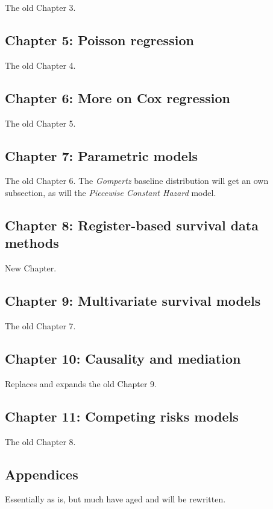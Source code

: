 \documentclass[a4paper,11pt]{article}
\begin{document}
The old Chapter 3.

\subsection*{Chapter 5: Poisson regression}

The old Chapter 4.

\subsection*{Chapter 6: More on Cox regression}

The old Chapter 5.

\subsection*{Chapter 7: Parametric models}

The old Chapter 6. The \emph{Gompertz} baseline distribution will get an
own subsection, as will the \emph{Piecewise Constant Hazard} model.

\subsection*{Chapter 8: Register-based survival data methods}

New Chapter.

\subsection*{Chapter 9: Multivariate survival models}

The old Chapter 7.

\subsection*{Chapter 10: Causality and mediation}

Replaces and expands the old Chapter 9.

\subsection*{Chapter 11: Competing risks models}

The old Chapter 8.

\subsection*{Appendices}

Essentially as is, but much have aged and will be rewritten.


\end{document}
